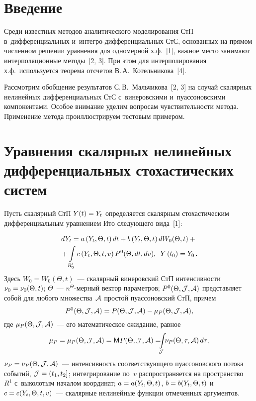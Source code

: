 


\thispagestyle{headings}

\begin{multicols}{2}

\label{st\stat}

\section{Введение}

Среди известных методов аналитического моделирования СтП 
в~дифференциальных и~ин\-тег\-ро-диф\-фе\-рен\-ци\-аль\-ных СтС, 
основанных на прямом численном решении уравнения для одномерной 
х.ф.~[1], важное место занимают интерполяционные методы~[2, 3]. 
При этом для интерполирования х.ф.\ используется теорема отсчетов В.\,А.~Котельникова~[4].

Рассмотрим обобщение результатов С.\,В.~Мальчикова~[2, 3] на 
случай скалярных нелинейных дифференциальных СтС с~винеровскими и~пуассоновскими 
компонентами. Особое внимание уделим вопросам чувствительности метода. 
Применение метода проиллюстрируем тестовым примером.

\section{Уравнения скалярных нелинейных дифференциальных стохастических систем}


Пусть скалярный СтП  $Y(t) \hm= Y_t$ определяется скалярным стохастическим 
дифференциальным уравнением Ито следующего вида~[1]:

\noindent
\begin{multline}
dY_t = a \left(Y_t, \Theta, t\right) dt + b \left(Y_t, \Theta, t\right) d W_0 
    (\Theta, t)+ {}\\
    {}+\iii_{R_0^1} c\left(Y_t, \Theta, t, v\right) 
    P^0 (\Theta, dt, dv),\enskip Y\left(t_0\right)=Y_0\,.
    \label{e2.1-s}
    \end{multline}
Здесь $W_0 = W_0 (\Theta, t)$~--- скалярный винеровский СтП 
интенсивности $\nu_0\hm=\nu_0 (\Theta, t)$; $\Theta$~--- 
$n^\Theta$-мер\-ный вектор па\-ра\-мет\-ров; $P^0(\Theta, \jj, \aa)$ 
 представляет собой для любого множества~$\aa$ 
 простой пуассоновский СтП, причем 
 $$
 P^0 (\Theta, \jj,\aa)\hm= P(\Theta, \jj,\aa)
 \hm- \mu_P (\Theta, \jj,\aa),$$
  где $\mu_P (\Theta, \jj,\aa)$~--- 
 его математическое ожидание, равное
    $$
    \mu_P =\mu_P(\Theta, \jj,\aa)=\mm P(\Theta, \jj,\aa)= 
\!\! \!   \iii_\jj \!\!\nu_P (\Theta, \tau,\aa)\, d\tau,
    $$
$\nu_P=\nu_P(\Theta, \jj,\aa)$~--- 
интенсивность соответ\-ст\-ву\-юще\-го пуассоновского потока событий, 
$\jj\hm= (t_1, t_2]$; 
интегрирование по~$v$ распространяется на пространство~$R^1$ 
с~выколотым началом координат; $a\hm=a(Y_t, \Theta, t)$, $b\hm=b(Y_t, \Theta, t)$ 
и~$c\hm=c(Y_t, \Theta, t,v)$~--- скалярные нелинейные функции отмеченных аргументов.


\end{multicols}
